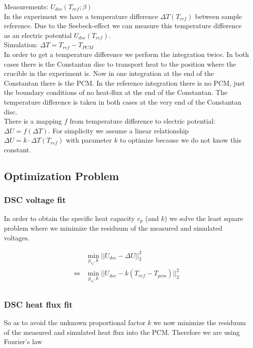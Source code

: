 \documentclass{scrartcl}[12pt, halfparskip]
\begin{document}
Measurements: $U_{dsc}(T_{ref};\beta)$ \\
In the experiment we have a temperature difference $\Delta T(T_{ref})$ between sample reference. 
Due to the Seebeck-effect we can measure this temperature difference as an electric potential $U_{dsc}(T_{ref})$. \\


Simulation: $\Delta T = T_{ref} - T_{PCM}$ \\
In order to get a temperature difference we perform the integration twice. 
In both cases there is the Constantan disc to transport heat to the position where the crucible in the experiment is. 
Now in one integration at the end of the Constantan there is the PCM. 
In the reference integration there is no PCM, just the boundary conditions of no heat-flux at the end of the Constantan.
The temperature difference is taken in both cases at the very end of the Constantan disc. \\

There is a mapping $f$ from temperature difference to electric potential: $\Delta U = f(\Delta T)$.
For simplicity we assume a linear relationship $\Delta U = k \cdot \Delta T(T_{ref})$ with parameter $k$ to optimize because we do not know this constant. \\

\subsection{Optimization Problem}
\subsubsection{DSC voltage fit}

In order to obtain the specific heat capacity $c_p$ (and $k$) we solve the least square problem where we minimize the residuum of the measured and simulated voltages.

\begin{align*}
	& \min_{p_{c_p}, k} ||U_{dsc} - \Delta U ||_2^2 \\
	\Leftrightarrow & \min_{p_{c_p}, k} ||U_{dsc} - k (T_{ref} - T_{pcm}) ||_2^2 \\
\end{align*}


\subsubsection{DSC heat flux fit}
So as to avoid the unknown proportional factor $k$ we now minimize the residuum of the measured and simulated heat flux into the PCM. Therefore we are using Fourier's law
\end{document}
